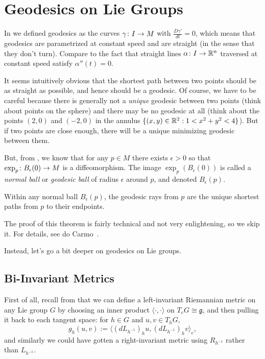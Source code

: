 
\section{Geodesics on Lie Groups}
\label{sec:geodesics on lie groups}

In  we defined geodesics as the curves $\gamma \colon\thinspace\! I \to M$ with $\frac{D\gamma'}{dt} = 0$, which means that geodesics are parametrized at constant speed and are straight (in the sense that they don't turn). Compare to the fact that straight lines $\alpha \colon\thinspace\! I \to \mathbb{R}^n$ traversed at constant speed satisfy $\alpha''(t)= 0$.

It seems intuitively obvious that the shortest path between two points should be as straight as possible, and hence should be a geodesic. Of course, we have to be careful because there is generally not a \emph{unique} geodesic between two points (think about points on the sphere) and there may be no geodesic at all (think about the points $(2,0)$ and $(-2,0)$ in the annulus $\{(x,y) \in \mathbb{R}^2 : 1 < x^2 + y^2 < 4\}$). But if two points are close enough, there will be a unique minimizing geodesic between them.

But, from , we know that for any $p \in M$ there exists $\epsilon > 0$ so that $\exp_p \colon\thinspace\! B_\epsilon(0) \to M$ is a diffeomorphism. The image $\exp_p(B_\epsilon(0))$ is called a \emph{normal ball} or \emph{geodesic ball} of radius $\epsilon$ around $p$, and denoted $B_\epsilon(p)$.

\begin{theorem}\label{thm:locally minimality of geodesics}
	Within any normal ball $B_\epsilon(p)$, the geodesic rays from $p$ are the unique shortest paths from $p$ to their endpoints.
\end{theorem}

The proof of this theorem is fairly technical and not very enlightening, so we skip it. For details, see do Carmo~\cite[\S 3.3]{docarmoRiemannianGeometry1992}.

Instead, let's go a bit deeper on geodesics on Lie groups.

\subsection{Bi-Invariant Metrics}

First of all, recall from  that we can define a left-invariant Riemannian metric on any Lie group $G$ by choosing an inner product $\langle \cdot , \cdot \rangle$ on $T_eG \cong \mathfrak{g}$, and then pulling it back to each tangent space: for $h \in G$ and $u,v \in T_hG$,
\begin{equation}\label{eq:left-invariant metric def}
	g_h(u,v) := \langle (dL_{h^{-1}})_h u, (dL_{h^{-1}})_hv \rangle_e,
\end{equation}
and similarly we could have gotten a right-invariant metric using $R_{h^{-1}}$ rather than $L_{h^{-1}}$.


